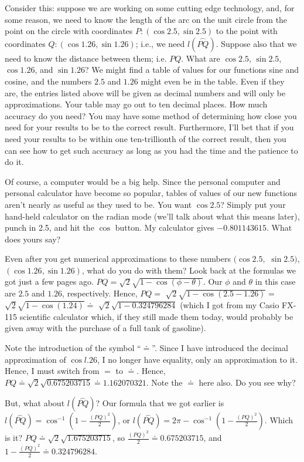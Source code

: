 \documentclass[english]{book}
\newcommand{\arc}[1]{\overset{\frown}{#1} }
\begin{document}
Consider this: suppose we are working on some cutting edge technology, and, for some reason, we need to know the length of the arc on the unit circle from the point on the circle with coordinates $P:( \cos 2.5, \sin 2.5)$ to the point with coordinates $Q:( \cos 1.26, \sin 1.26)$; i.e., we need $l(\arc{PQ})$. Suppose also that we need to know the distance between them; i.e. $PQ$. What are $\cos 2.5$, $\sin 2.5$, $\cos 1.26$, and $\sin 1.26$? We might find a table of values for our functions sine and cosine, and the numbers $2.5$ and $1.26$ might even be in the table. Even if they are, the entries listed above will be given as decimal numbers and will only be approximations. Your table may go out to ten decimal places. How much accuracy do you need? You may have some method of determining how close you need for your results to be to the correct result. Furthermore, I'll bet that if you need your results to be within one ten-trillionth of the correct result, then you can see how to get such accuracy as long as you had the time and the patience to do it. 

Of course, a computer would be a big help. Since the personal computer and personal calculator have become so popular, tables of values of our new functions aren't nearly as useful as they used to be. You want $\cos 2.5$? Simply put your hand-held calculator on the radian mode (we'll talk about what this means later), punch in 2.5, and hit the $\cos$ button. My calculator gives $-0.801143615$. What does yours say? 

Even after you get numerical approximations to these numbers $(\cos 2.5,$ $\sin 2.5)$, $(\cos 1.26, \sin 1.26)$, what do you do with them? Look back at the formulas we got just a few pages ago. $PQ = \sqrt{2} \sqrt{1- \cos (\phi - \theta)}$. Our $\phi$ and $\theta$ in this case are $2.5$ and $1.26$, respectively. Hence, $PQ =$ $\sqrt{2} \sqrt{1- \cos (2.5 - 1.26)} =$ $\sqrt{2} \sqrt{1- \cos (1.24)} \doteq$ $\sqrt{2} \sqrt{1 - 0.324796284}$ (which I got from my Casio FX-115 scientific calculator which, if they still made them today, would probably be given away with the purchase of a full tank of gasoline). 

Note the introduction of the symbol ``$\doteq$''. Since I have introduced the decimal approximation of $\cos l.26$, I no longer have equality, only an approximation to it. Hence, I must switch from $=$ to $\doteq$. Hence, $PQ \doteq \sqrt{2} \sqrt{0.675203715} \doteq  1.162070321$. Note the $\doteq$ here also. Do you see why? 

But, what about $l(\arc{PQ})$? Our formula that we got earlier is $l(\arc{PQ}) = \cos^{-1} (1- \frac{(PQ)^{2}}{2})$, or $l(\arc{PQ}) = 2\pi - \cos^{-1} (1- \frac{(PQ)^{2}}{2})$. Which is it? $PQ \doteq \sqrt{2} \sqrt{1.675203715}$, so $\frac{(PQ)^{2}}{2} \doteq 0.675203715$, and $1- \frac{(PQ)^{2}}{2} \doteq 0.324796284$.
\end{document}
